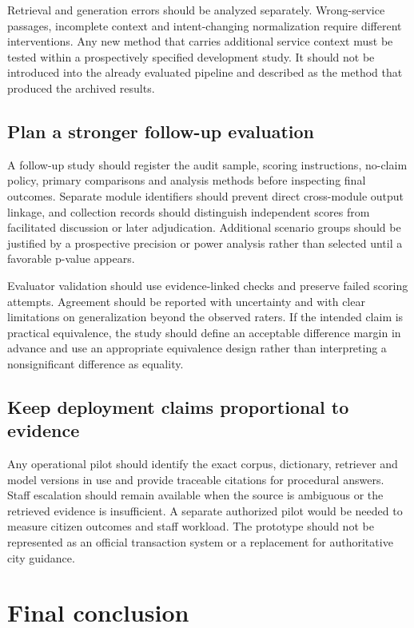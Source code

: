 Retrieval and generation errors should be analyzed separately. Wrong-service passages, incomplete context and intent-changing normalization require different interventions. Any new method that carries additional service context must be tested within a prospectively specified development study. It should not be introduced into the already evaluated pipeline and described as the method that produced the archived results.


\subsection{Plan a stronger follow-up evaluation}

A follow-up study should register the audit sample, scoring instructions, no-claim policy, primary comparisons and analysis methods before inspecting final outcomes. Separate module identifiers should prevent direct cross-module output linkage, and collection records should distinguish independent scores from facilitated discussion or later adjudication. Additional scenario groups should be justified by a prospective precision or power analysis rather than selected until a favorable p-value appears.


Evaluator validation should use evidence-linked checks and preserve failed scoring attempts. Agreement should be reported with uncertainty and with clear limitations on generalization beyond the observed raters. If the intended claim is practical equivalence, the study should define an acceptable difference margin in advance and use an appropriate equivalence design rather than interpreting a nonsignificant difference as equality.


\subsection{Keep deployment claims proportional to evidence}

Any operational pilot should identify the exact corpus, dictionary, retriever and model versions in use and provide traceable citations for procedural answers. Staff escalation should remain available when the source is ambiguous or the retrieved evidence is insufficient. A separate authorized pilot would be needed to measure citizen outcomes and staff workload. The prototype should not be represented as an official transaction system or a replacement for authoritative city guidance.


\section{Final conclusion}

